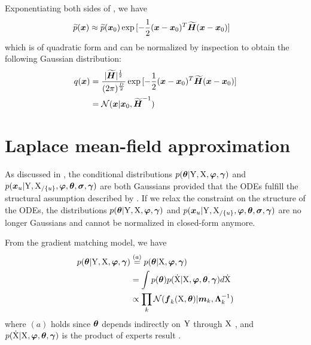 Exponentiating both sides of , we have 
\begin{align}
    \widetilde{p}(\boldsymbol{x}) 
    & \approx \widetilde{p}(\boldsymbol{x}_0) 
        \exp{[
            - \frac{1}{2}(\boldsymbol{x} - \boldsymbol{x}_0)^T\boldsymbol{\widetilde{H}}(\boldsymbol{x} - \boldsymbol{x}_0)
        ]}
    \label{eq-laplace-p-exp}
\end{align}
which is of quadratic form and can be normalized by inspection to obtain the following Gaussian distribution:
\begin{align}
    q(\boldsymbol{x}) 
    & = \frac{\lvert \boldsymbol{\widetilde{H}} \rvert^{\frac{1}{2}}}{(2\pi)^{\frac{
    D}{2}}} \exp{[
        - \frac{1}{2}(\boldsymbol{x} - \boldsymbol{x}_0)^T\boldsymbol{\widetilde{H}}(\boldsymbol{x} - \boldsymbol{x}_0)
    ]}
    \nonumber
    \\
    & = \mathcal{N}(\boldsymbol{x}\vert \boldsymbol{x}_0,
    \boldsymbol{\widetilde{H}}^{-1})
    \label{eq-laplace-q}
\end{align}

\section{Laplace mean-field approximation}
\label{sec-laplace-mean-field}

As discussed in , the conditional distributions $p(\boldsymbol{\theta}\vert\mathrm{Y},\mathrm{X},\boldsymbol{\varphi},\boldsymbol{\gamma})$  and $p(\boldsymbol{x}_{u}\vert\mathrm{Y},\mathrm{X}_{/\{u\}},\boldsymbol{\varphi},\boldsymbol{\theta},\boldsymbol{\sigma},\boldsymbol{\gamma})$  are both Gaussians provided that the ODEs fulfill the structural assumption described by .
If we relax the constraint on the structure of the ODEs, the distributions $p(\boldsymbol{\theta}\vert\mathrm{Y},\mathrm{X},\boldsymbol{\varphi},\boldsymbol{\gamma})$ and $p(\boldsymbol{x}_{u}\vert\mathrm{Y},\mathrm{X}_{/\{u\}},\boldsymbol{\varphi},\boldsymbol{\theta},\boldsymbol{\sigma},\boldsymbol{\gamma})$ are no longer Gaussians and cannot be normalized in closed-form anymore.

From the gradient matching model, we have
\begin{align}
    p(\boldsymbol{\theta}\vert\mathrm{Y},\mathrm{X},\boldsymbol{\varphi},\boldsymbol{\gamma}) 
    & \stackrel{(a)}{=} 
    p(\boldsymbol{\theta}\vert\mathrm{X},\boldsymbol{\varphi},\boldsymbol{\gamma}) 
    \nonumber
    \\
    & = 
    \int{
        p(\boldsymbol{\theta}) p(\mathrm{\dot{X}}\vert\mathrm{X},\boldsymbol{\ensuremath{\varphi}},\boldsymbol{\theta},\boldsymbol{\gamma})d\mathrm{\dot{X}}}
    \nonumber
    \\     
    & \propto 
    \prod_k{\mathcal{N}(\boldsymbol{f}_{k}(\mathrm{X}, \boldsymbol{\theta})\vert\boldsymbol{m}_{k},\boldsymbol{\Lambda}_{k}^{-1})}
    \label{eq-laplace-theta-objective}
\end{align}
where $(a)$ holds since $\boldsymbol{\theta}$ depends indirectly on $\mathrm{Y}$ through $\mathrm{X}$ \citep{gorbach2017scalable}, and $p(\mathrm{\dot{X}}\vert\mathrm{X},\boldsymbol{\varphi},\boldsymbol{\theta},\boldsymbol{\gamma})$ is the product of experts result .

